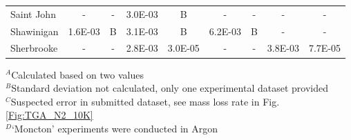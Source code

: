 \documentclass{book}
\begin{document}
\begin{table}[h!]
\begin{center}
\begin{tabular}{|l|cc|cc|cc|cc|}
Saint John              & -           & -               & 3.0E-03        & B                & -          & -                 & -           & -                     \\
Shawinigan              & 1.6E-03     & B               & 3.1E-03        & B                & 6.2E-03    & B                 & -           & -                     \\
Sherbrooke              & -           & -               & 2.8E-03        & 3.0E-05          & -          & -                 & 3.8E-03     & 7.7E-05               \\  \hline
\end{tabular}
\end{center}
$^A$Calculated based on two values \\
$^B$Standard deviation not calculated, only one experimental dataset provided \\
$^C$Suspected error in submitted dataset, see mass loss rate in Fig. \ref{Fig:TGA_N2_10K}\\
$^D$`Moncton' experiments were conducted in Argon
\end{table}
\end{document}
